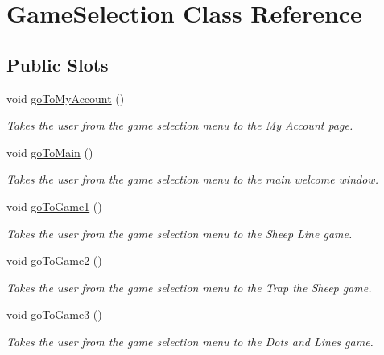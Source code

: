 \hypertarget{classGameSelection}{\section{\-Game\-Selection \-Class \-Reference}
\label{classGameSelection}
}
\subsection*{\-Public \-Slots}
\begin{DoxyCompactItemize}
\item 
void \hyperlink{classGameSelection_ac05fa74d67c03407e532fb627eaafd37}{go\-To\-My\-Account} ()
\begin{DoxyCompactList}\small\item\em \-Takes the user from the game selection menu to the \-My \-Account page. \end{DoxyCompactList}\item 
void \hyperlink{classGameSelection_a9c137b0feaa79fa0be575e71fe12f60b}{go\-To\-Main} ()
\begin{DoxyCompactList}\small\item\em \-Takes the user from the game selection menu to the main welcome window. \end{DoxyCompactList}\item 
void \hyperlink{classGameSelection_a94882519629ecb0344fec9e0d8e1a66b}{go\-To\-Game1} ()
\begin{DoxyCompactList}\small\item\em \-Takes the user from the game selection menu to the \-Sheep \-Line game. \end{DoxyCompactList}\item 
void \hyperlink{classGameSelection_a2836cb7f7290727491a4843a191cb9b2}{go\-To\-Game2} ()
\begin{DoxyCompactList}\small\item\em \-Takes the user from the game selection menu to the \-Trap the \-Sheep game. \end{DoxyCompactList}\item 
void \hyperlink{classGameSelection_a6aa089b1aca3b4cbabe883c920e89c6f}{go\-To\-Game3} ()
\begin{DoxyCompactList}\small\item\em \-Takes the user from the game selection menu to the \-Dots and \-Lines game. \end{DoxyCompactList}\end{DoxyCompactItemize}

